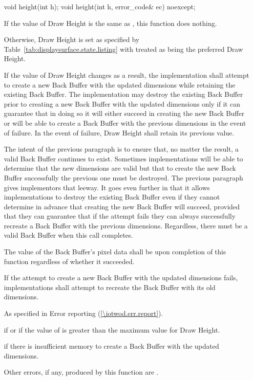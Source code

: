 \begin{itemdecl}
void height(int h);
void height(int h, error_code& ec) noexcept;
\end{itemdecl}
\begin{itemdescr}
\pnum
\effects
If the value of Draw Height is the same as , this function does nothing.

\pnum
Otherwise, Draw Height is set as specified by Table~\ref{tab:displaysurface.state.listing} with  treated as being the preferred Draw Height.

\pnum
If the value of Draw Height changes as a result, the implementation shall attempt to create a new Back Buffer with the updated dimensions while retaining the existing Back Buffer. The implementation may destroy the existing Back Buffer prior to creating a new Back Buffer with the updated dimensions only if it can guarantee that in doing so it will either succeed in creating the new Back Buffer or will be able to create a Back Buffer with the previous dimensions in the event of failure. In the event of failure, Draw Height shall retain its previous value.

\pnum
\enternote
The intent of the previous paragraph is to ensure that, no matter the result, a valid Back Buffer continues to exist. Sometimes implementations will be able to determine that the new dimensions are valid but that to create the new Back Buffer successfully the previous one must be destroyed. The previous paragraph gives implementors that leeway. It goes even further in that it allows implementations to destroy the existing Back Buffer even if they cannot determine in advance that creating the new Back Buffer will succeed, provided that they can guarantee that if the attempt fails they can always successfully recreate a Back Buffer with the previous dimensions. Regardless, there must be a valid Back Buffer when this call completes.
\exitnote

\pnum
The value of the Back Buffer's pixel data shall be \unspecnorm upon completion of this function regardless of whether it succeeded.

\pnum
If the attempt to create a new Back Buffer with the updated dimensions fails, implementations shall attempt to recreate the Back Buffer with its old dimensions.

\pnum
\throws
As specified in Error reporting (\ref{\iotwod.err.report}).

\pnum
\errors
{} if  or if the value of  is greater than the maximum value for Draw Height.

 if there is insufficient memory to create a Back Buffer with the updated dimensions.

Other errors, if any, produced by this function are .
\end{itemdescr}

